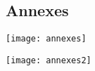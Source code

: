 %
%
%
%
%
%
%
%
\ifprof
\else
\subsection*{Annexes}

\texttt{[image: annexes]}

\texttt{[image: annexes2]}
\fi
%

